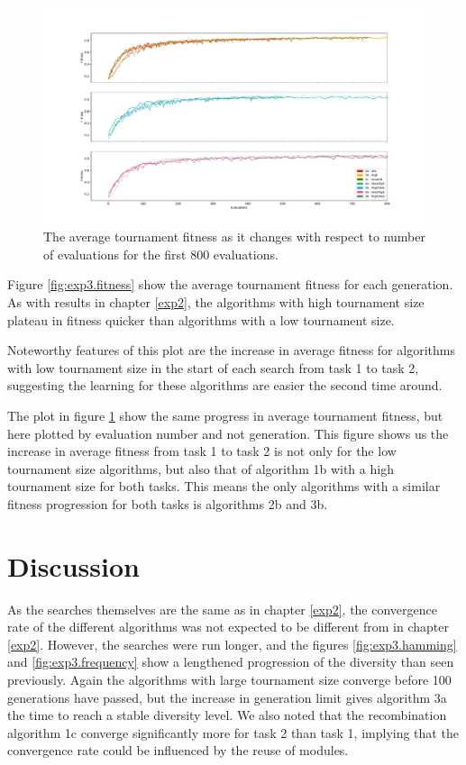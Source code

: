 \begin{figure}
    \includegraphics[width=1.25\textwidth, center]{Chapters/4.Experiments/exp3/figures/fitness_by_evaluations.pdf}
    \caption[Average tournament fitness plotted by evaluation]{The average tournament fitness as it changes with respect to number of evaluations for the first 800 evaluations.}
    \label{fig:exp3.fitness_by_evaluations}
\end{figure}

Figure \ref{fig:exp3.fitness} show the average tournament fitness for each generation. As with results in chapter \ref{exp2}, the algorithms with high tournament size plateau in fitness quicker than algorithms with a low tournament size.

Noteworthy features of this plot are the increase in average fitness for algorithms with low tournament size in the start of each search from task 1 to task 2, suggesting the learning for these algorithms are easier the second time around. 

The plot in figure \ref{fig:exp3.fitness_by_evaluations} show the same progress in average tournament fitness, but here plotted by evaluation number and not generation. This figure shows us the increase in average fitness from task 1 to task 2 is not only for the low tournament size algorithms, but also that of algorithm 1b with a high tournament size for both tasks. This means the only algorithms with a similar fitness progression for both tasks is algorithms 2b and 3b. 

\section{Discussion}
As the searches themselves are the same as in chapter \ref{exp2}, the convergence rate of the different algorithms was not expected to be different from in chapter \ref{exp2}. However, the searches were run longer, and the figures \ref{fig:exp3.hamming} and \ref{fig:exp3.frequency} show a lengthened progression of the diversity than seen previously. Again the algorithms with large tournament size converge before 100 generations have passed, but the increase in generation limit gives algorithm 3a the time to reach a stable diversity level. We also noted that the recombination algorithm 1c converge significantly more for task 2 than task 1, implying that the convergence rate could be influenced by the reuse of modules. 

